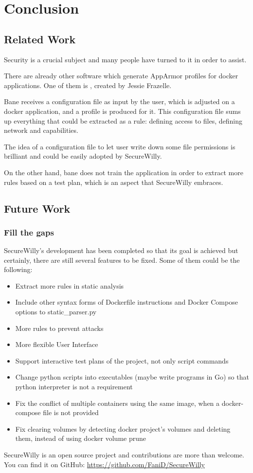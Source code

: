 \chapter{Conclusion}
\section{Related Work}

Security is a crucial subject and many people have turned to it in order to assist.

There are already other software which generate AppArmor profiles for docker applications. One of them is , created by Jessie Frazelle. \cite{bane}

Bane receives a configuration file as input by the user, which is adjusted on a docker application, and a profile is produced for it. This configuration file sums up everything that could be extracted as a rule: defining access to files, defining network and capabilities.

The idea of a configuration file to let user write down some file permissions is brilliant and could be easily adopted by SecureWilly.

On the other hand, bane does not train the application in order to extract more rules based on a test plan, which is an aspect that SecureWilly embraces.

\section{Future Work}

\subsection{Fill the gaps}
SecureWilly's development has been completed so that its goal is achieved but certainly, there are still several features to be fixed. Some of them could be the following:
\begin{itemize}
\item Extract more rules in static analysis
\item Include other syntax forms of Dockerfile instructions and Docker Compose options to static\_parser.py
\item More rules to prevent attacks
\item More flexible User Interface
\item Support interactive test plans of the project, not only script commands
\item Change python scripts into executables (maybe write programs in Go) so that python interpreter is not a requirement
\item Fix the conflict of multiple containers using the same image, when a docker-compose file is not provided
\item Fix clearing volumes by detecting docker project's volumes and deleting them, instead of using docker volume prune
\end{itemize}
SecureWilly is an open source project and contributions are more than welcome. You can find it on GitHub: \url{https://github.com/FaniD/SecureWilly}

